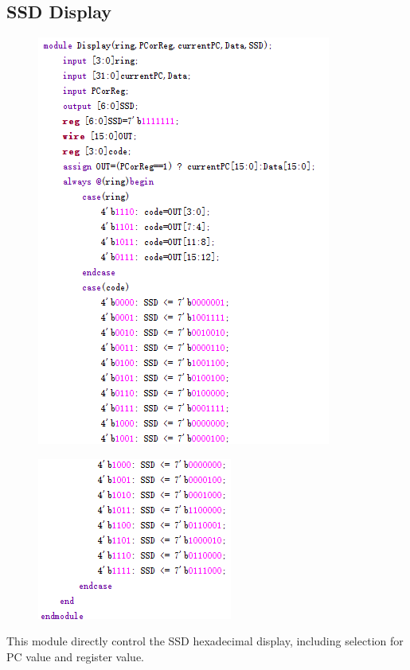 \documentclass[12pt]{article}
\begin{document}
\subsection{SSD Display}
\begin{figure}[H]
\centering
\includegraphics[scale=1]{SSD1.jpg}
\end{figure}
\begin{figure}[H]
\centering
\includegraphics[scale=1]{SSD2.jpg}
\end{figure}
This module directly control the SSD hexadecimal display, including selection for PC value and register value.
\end{document}
